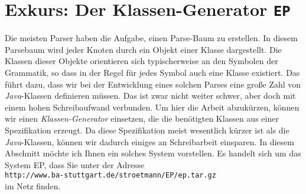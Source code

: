 
\section{Exkurs: Der Klassen-Generator \texttt{EP}}
Die meisten Parser haben die Aufgabe, einen Parse-Baum zu erstellen.  In diesem Parsebaum wird jeder
Knoten durch ein Objekt einer Klasse dargestellt.  Die Klassen dieser Objekte orientieren sich
typischerweise an den Symbolen der Grammatik, so dass in der Regel f\"ur jedes Symbol auch eine Klasse
existiert.  Das f\"uhrt dazu, dass wir bei der Entwicklung eines solchen Parses eine gro{\ss}e Zahl von
\textsl{Java}-Klassen definieren m\"ussen.  Das ist zwar nicht weiter schwer, aber doch mit einem
hohen Schreibaufwand verbunden.  Um hier die Arbeit abzuk\"urzen, k\"onnen wir einen
\emph{Klassen-Generator} einsetzen, die die ben\"otigten Klassen aus einer Spezifikation erzeugt.  Da
diese Spezifikation meist wesentlich k\"urzer ist als die \textsl{Java}-Klassen, k\"onnen wir dadurch 
einiges an Schreibarbeit einsparen.  In diesem Abschnitt m\"ochte ich Ihnen ein solches System
vorstellen.  Es handelt sich um das System EP, dass Sie unter der Adresse
\\[0.2cm]
\hspace*{1.3cm}
\texttt{http://www.ba-stuttgart.de/stroetmann/EP/ep.tar.gz}
\\[0.2cm]
im Netz finden.

